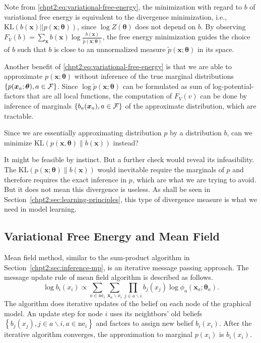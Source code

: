 \begin{remark}
  Note from \eqref{chpt2:eq:variational-free-energy}, the minimization with regard to $b$ of variational free energy is equivalent to the divergence minimization, i.e., $\mathrm{KL}(b( \bm{x}) || p(\bm{x}; \bm{\theta}))$, since $\log{Z(\bm{\theta})}$ does not depend on $b$. By observing $F_V(b) = \sum_{\bm{x}}b(\bm{x}) \log{\frac{b(\bm{x})}{\tilde{p}(\bm{x}; \bm{\theta})}}$, the free energy minimization guides the choice of $b$ such that $b$ is close to an unnormalized measure $\tilde{p}(\bm{x}; \bm{\theta})$ in its space.

  Another benefit of \eqref{chpt2:eq:variational-free-energy} is that we are able to approximate $p(\bm{x}; \bm{\theta})$ without inference of the true marginal distributions $\{p(\bm{x}_{a};\bm{\theta}), a \in \mathcal{F}\}$. Since $\log\tilde{p}(\bm{x}; \bm{\theta})$ can be formulated as sum of log-potential-factors that are all local functions, the computation of $F_V(v)$ can be done by inference of marginals $\left\{ b_{a}(\bm{x}_{a}), a \in \mathcal{F} \right\}$ of the approximate distribution, which are tractable.
\end{remark}

\begin{remark}[Discussion]
  Since we are essentially approximating distribution $p$ by a distribution $b$, can we minimize $\mathrm{KL}(p(\bm{x}, \bm{\theta})\|b(\bm{x}))$ instead?

  It might be feasible by instinct. But a further check would reveal its infeasibility. The $\mathrm{KL}(p(\bm{x}; \bm{\theta})\|b(\bm{x}))$ would inevitable require the marginals of $p$ and therefore requires the exact inference in $p$, which are what we are trying to avoid. But it does not mean this divergence is useless. As shall be seen in Section~\ref{chpt2:sec:learning-principles}, this type of divergence measure is what we need in model learning.
\end{remark}



\subsection{Variational Free Energy and Mean Field}

Mean field method, similar to the sum-product algorithm in Section~\ref{chpt2:sec:inference-mp}, is an iterative message passing approach. 
The message update rule of mean field algorithm is described as follows.
\begin{equation}\label{chpt2:eq:mf-update}
  \log{b_i(x_i)} \propto \sum_{a \in \mathrm{ne}_i} \sum_{\bm{x}_{a} \backslash x_i} \prod_{j\in {a}\backslash i} b_j(x_j)\log{\phi_{a}}(\bm{x}_{a};\bm{\theta}_{a}).
\end{equation}
The algorithm does iterative updates of the belief on each node of the graphical model. An update step for node $i$ uses its neightbors' old  beliefs  $\left\{ b_j(x_j), j\in {a}\backslash i, a \in \mathrm{ne}_i \right\}$ and factors to assign new belief $b_i(x_i)$. After the iterative algorithm converges, the approximation to marginal $p(x_i)$ is $b_i(x_i)$.


